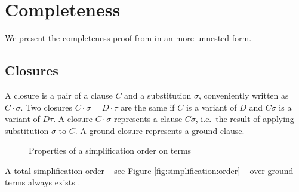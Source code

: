 
\chapter{Completeness}

We present the completeness proof from \cite{GK2004csl} in an more unnested form.

\section{Closures}

\begin{definition}
    A closure is a pair of a clause $C$ and a substitution $\sigma$,
    conveniently written as $C\cdot\sigma$. Two closures $C\cdot\sigma = D\cdot\tau$
    are the same if $C$ is a variant of $D$ and $C\sigma$ is a variant of $D\tau$.
    A closure $C\cdot\sigma$ represents a clause $C\sigma$,
    i.e.~the result of applying substitution $\sigma$ to $C$.
    A ground closure represents a ground clause.
\end{definition}

\begin{figure}\label{fig:simplification:order}

\caption{Properties of a simplification order on terms}
\end{figure}

\begin{lemma}
    A total simplification order
    – see Figure \vref{fig:simplification:order} –
    over ground terms always exists \cite{NR2001}.
\end{lemma}


